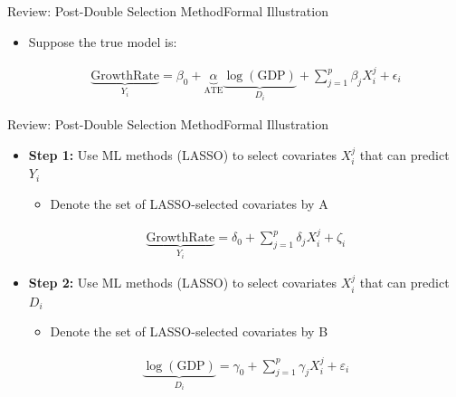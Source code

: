 \documentclass[hyperref={pdfpagelabels=false}]{beamer}
\begin{document}
\begin{frame}{Review: Post-Double Selection Method}{Formal Illustration}

\begin{itemize}
\item Suppose the true model is:

\begin{eqnarray*}
	\underbrace{\mbox{GrowthRate}}_{Y_{i}} = \beta_{0} + \underbrace{\alpha}_{\mbox{ATE}} \underbrace{\log(\mbox{GDP})}_{D_{i}}	+ \sum^{p}_{j=1} \beta_{j} X^{j}_{i} + \epsilon_{i}	
\end{eqnarray*}




\end{itemize}

\end{frame}


\begin{frame}{Review: Post-Double Selection Method}{Formal Illustration}

\begin{itemize}



\item \textbf{Step 1:} Use ML methods (LASSO) to select covariates $X^{j}_{i}$ that can predict $Y_{i}$
\vspace{0.3cm}
\begin{itemize}
\item Denote the set of LASSO-selected covariates by A
\end{itemize}
\begin{eqnarray*}
\underbrace{\mbox{GrowthRate}}_{Y_{i}} = \delta_{0} + \sum^{p}_{j=1} \delta_{j} X^{j}_{i}  + \zeta_{i}
\end{eqnarray*}


\vspace{0.3cm}
\item \textbf{Step 2:} Use ML methods (LASSO) to select covariates $X^{j}_{i}$ that can predict $D_{i}$ 
\vspace{0.3cm}
\begin{itemize}
\item Denote the set of LASSO-selected covariates by B
\end{itemize}
\begin{eqnarray*}
\underbrace{\log(\mbox{GDP})}_{D_{i}} = \gamma_{0} +  \sum^{p}_{j=1} \gamma_{j} X^{j}_{i}  + \varepsilon_{i}
\end{eqnarray*}


\end{itemize}

\end{frame}
\end{document}
